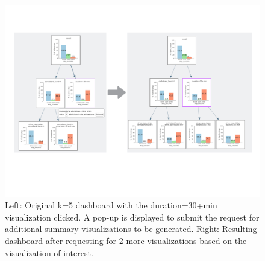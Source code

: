 \begin{figure}[ht!]
\centering
\includegraphics[width=\linewidth]{figures/expansion_example.pdf}
\caption{Left: Original k=5 dashboard with the duration=30+min visualization clicked. A pop-up is displayed to submit the request for additional summary visualizations to be generated. Right: Resulting dashboard after requesting for 2 more visualizations based on the visualization of interest.}
\label{fig:altroot_expansion}
\end{figure}

